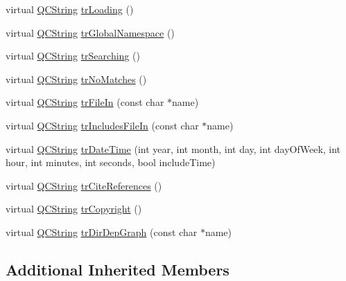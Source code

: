 \begin{DoxyCompactItemize}
\item 
virtual \mbox{\hyperlink{class_q_c_string}{Q\+C\+String}} \mbox{\hyperlink{class_translator_catalan_adec9f771b481b77eb110ceeccd702811}{tr\+Loading}} ()
\item 
virtual \mbox{\hyperlink{class_q_c_string}{Q\+C\+String}} \mbox{\hyperlink{class_translator_catalan_aba4ea5c0dff73774f25cb24a416e4bda}{tr\+Global\+Namespace}} ()
\item 
virtual \mbox{\hyperlink{class_q_c_string}{Q\+C\+String}} \mbox{\hyperlink{class_translator_catalan_af9bdc6ff9219376084ef32175daf99ae}{tr\+Searching}} ()
\item 
virtual \mbox{\hyperlink{class_q_c_string}{Q\+C\+String}} \mbox{\hyperlink{class_translator_catalan_ab50afd95cd8aa1bf1ebaadf11a5b26c7}{tr\+No\+Matches}} ()
\item 
virtual \mbox{\hyperlink{class_q_c_string}{Q\+C\+String}} \mbox{\hyperlink{class_translator_catalan_a74a36a31dcdc2bf207d97b5ea314c739}{tr\+File\+In}} (const char $\ast$name)
\item 
virtual \mbox{\hyperlink{class_q_c_string}{Q\+C\+String}} \mbox{\hyperlink{class_translator_catalan_a8325005bd0f609f86413e9263151d871}{tr\+Includes\+File\+In}} (const char $\ast$name)
\item 
virtual \mbox{\hyperlink{class_q_c_string}{Q\+C\+String}} \mbox{\hyperlink{class_translator_catalan_af79c64f486cb2a02a213b33e63a2cc66}{tr\+Date\+Time}} (int year, int month, int day, int day\+Of\+Week, int hour, int minutes, int seconds, bool include\+Time)
\item 
virtual \mbox{\hyperlink{class_q_c_string}{Q\+C\+String}} \mbox{\hyperlink{class_translator_catalan_ad9653ad20d3a6568eae019b0029501cc}{tr\+Cite\+References}} ()
\item 
virtual \mbox{\hyperlink{class_q_c_string}{Q\+C\+String}} \mbox{\hyperlink{class_translator_catalan_a792d3d011ea78e8bcf0fd9729ef5ea58}{tr\+Copyright}} ()
\item 
virtual \mbox{\hyperlink{class_q_c_string}{Q\+C\+String}} \mbox{\hyperlink{class_translator_catalan_af31acbb2bd1658f9fdfe832be789c703}{tr\+Dir\+Dep\+Graph}} (const char $\ast$name)
\end{DoxyCompactItemize}
\subsection*{Additional Inherited Members}


